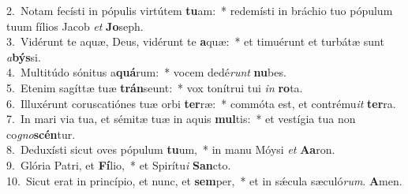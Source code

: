 {2.~}Notam fecísti in pópulis virtútem \textbf{tu}am:~* redemísti in bráchio tuo pópulum tuum fílios Jacob \textit{et} \textbf{Jo}seph.\\
{3.~}Vidérunt te aquæ, Deus, vidérunt te \textbf{a}quæ:~* et timuérunt et turbátæ sunt \textit{a}\textbf{býs}si.\\
{4.~}Multitúdo sónitus a\textbf{quá}rum:~* vocem dedé\textit{runt} \textbf{nu}bes.\\
{5.~}Etenim sagíttæ tuæ \textbf{trán}seunt:~* vox tonítrui tui \textit{in} \textbf{ro}ta.\\
{6.~}Illuxérunt coruscatiónes tuæ orbi \textbf{ter}ræ:~* commóta est, et contrému\textit{it} \textbf{ter}ra.\\
{7.~}In mari via tua, et sémitæ tuæ in aquis \textbf{mul}tis:~* et vestígia tua non co\textit{gno}\textbf{scén}tur.\\
{8.~}Deduxísti sicut oves pópulum \textbf{tu}um,~* in manu Móysi \textit{et} \textbf{A}\textbf{a}ron.\\
{9.~}Glória Patri, et \textbf{Fí}lio,~* et Spirítu\textit{i} \textbf{San}cto.\\
{10.~}Sicut erat in princípio, et nunc, et \textbf{sem}per,~* et in sǽcula sæculó\textit{rum}. \textbf{A}men.\\
